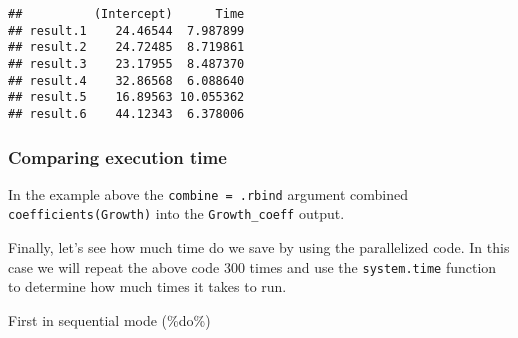 \documentclass[]{article}
\newenvironment{Shaded}{\begin{snugshade}}{\end{snugshade}}
\newcommand{\KeywordTok}[1]{\textcolor[rgb]{0.13,0.29,0.53}{\textbf{#1}}}
\newcommand{\DataTypeTok}[1]{\textcolor[rgb]{0.13,0.29,0.53}{#1}}
\newcommand{\DecValTok}[1]{\textcolor[rgb]{0.00,0.00,0.81}{#1}}
\newcommand{\StringTok}[1]{\textcolor[rgb]{0.31,0.60,0.02}{#1}}
\newcommand{\ControlFlowTok}[1]{\textcolor[rgb]{0.13,0.29,0.53}{\textbf{#1}}}
\newcommand{\OperatorTok}[1]{\textcolor[rgb]{0.81,0.36,0.00}{\textbf{#1}}}
\newcommand{\NormalTok}[1]{#1}
\begin{document}
\begin{verbatim}
##          (Intercept)      Time
## result.1    24.46544  7.987899
## result.2    24.72485  8.719861
## result.3    23.17955  8.487370
## result.4    32.86568  6.088640
## result.5    16.89563 10.055362
## result.6    44.12343  6.378006
\end{verbatim}

\subsubsection{Comparing execution time}\label{comparing-execution-time}

In the example above the \texttt{combine\ =\ .rbind} argument combined
\texttt{coefficients(Growth)} into the \texttt{Growth\_coeff} output.

Finally, let's see how much time do we save by using the parallelized
code. In this case we will repeat the above code 300 times and use the
\texttt{system.time} function to determine how much times it takes to
run.

First in sequential mode (\%do\%)

\begin{Shaded}
\end{Shaded}
\end{document}
